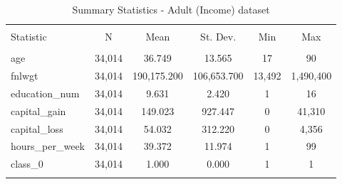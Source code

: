 
\begin{table}[H] \centering 
  \caption{Summary Statistics - Adult (Income) dataset} 
  \label{tbl:summary_stats_50k_2} 
\begin{tabular}{@{\extracolsep{5pt}}lccccc} 
\\[-1.8ex]\hline 
\hline \\[-1.8ex] 
Statistic & \multicolumn{1}{c}{N} & \multicolumn{1}{c}{Mean} & \multicolumn{1}{c}{St. Dev.} & \multicolumn{1}{c}{Min} & \multicolumn{1}{c}{Max} \\ 
\hline \\[-1.8ex] 
age & 34,014 & 36.749 & 13.565 & 17 & 90 \\ 
fnlwgt & 34,014 & 190,175.200 & 106,653.700 & 13,492 & 1,490,400 \\ 
education\_num & 34,014 & 9.631 & 2.420 & 1 & 16 \\ 
capital\_gain & 34,014 & 149.023 & 927.447 & 0 & 41,310 \\ 
capital\_loss & 34,014 & 54.032 & 312.220 & 0 & 4,356 \\ 
hours\_per\_week & 34,014 & 39.372 & 11.974 & 1 & 99 \\ 
class\_0 & 34,014 & 1.000 & 0.000 & 1 & 1 \\ 
\hline \\[-1.8ex] 
\end{tabular} 
\end{table} 
